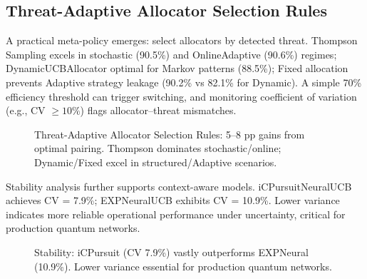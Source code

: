 \documentclass[10pt,twocolumn,journal]{IEEEtran}
\begin{document}
\subsection{Threat-Adaptive Allocator Selection Rules}

A practical meta-policy emerges: select allocators by detected threat. Thompson Sampling excels in stochastic (90.5\%) and OnlineAdaptive (90.6\%) regimes; DynamicUCBAllocator optimal for Markov patterns (88.5\%); Fixed allocation prevents Adaptive strategy leakage (90.2\% vs 82.1\% for Dynamic). A simple 70\% efficiency threshold can trigger switching, and monitoring coefficient of variation (e.g., CV $\geq 10\%$) flags allocator--threat mismatches.

\begin{figure}[t]
\centering
{}
\caption{Threat-Adaptive Allocator Selection Rules: 5--8 pp gains from optimal pairing. Thompson dominates stochastic/online; Dynamic/Fixed excel in structured/Adaptive scenarios.}
\label{fig:threat_rules}
\end{figure}

Stability analysis further supports context-aware models. iCPursuitNeuralUCB achieves CV = 7.9\%; EXPNeuralUCB exhibits CV = 10.9\%. Lower variance indicates more reliable operational performance under uncertainty, critical for production quantum networks.

\begin{figure}[t]
\centering
{}
\caption{Stability: iCPursuit (CV 7.9\%) vastly outperforms EXPNeural (10.9\%). Lower variance essential for production quantum networks.}
\label{fig:stability}
\end{figure}
\end{document}
